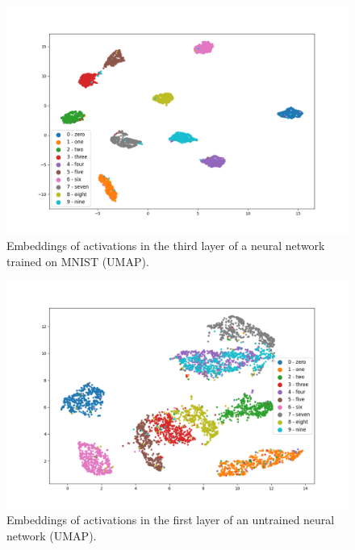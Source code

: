 \documentclass{article}
\begin{document}
\begin{figure}
  \centering
    \includegraphics[width=1.0\textwidth]{../../out/activations_cnn/mnist/umap/trained/plot_l3.png}
    \caption{Embeddings of activations in the third layer of a neural network trained on MNIST (UMAP).}
\end{figure}

\begin{figure}
  \centering
    \includegraphics[width=1.0\textwidth]{../../out/activations_cnn/mnist/umap/untrained/plot_l1_f0.png}
    \caption{Embeddings of activations in the first layer of an untrained neural network (UMAP).}
\end{figure}
\end{document}
